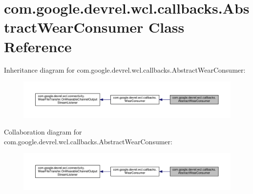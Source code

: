 \hypertarget{classcom_1_1google_1_1devrel_1_1wcl_1_1callbacks_1_1AbstractWearConsumer}{}\section{com.\+google.\+devrel.\+wcl.\+callbacks.\+Abstract\+Wear\+Consumer Class Reference}
\label{classcom_1_1google_1_1devrel_1_1wcl_1_1callbacks_1_1AbstractWearConsumer}


Inheritance diagram for com.\+google.\+devrel.\+wcl.\+callbacks.\+Abstract\+Wear\+Consumer\+:
\nopagebreak
\begin{figure}[H]
\begin{center}
\leavevmode
\includegraphics[width=350pt]{dc/d2d/classcom_1_1google_1_1devrel_1_1wcl_1_1callbacks_1_1AbstractWearConsumer__inherit__graph}
\end{center}
\end{figure}


Collaboration diagram for com.\+google.\+devrel.\+wcl.\+callbacks.\+Abstract\+Wear\+Consumer\+:
\nopagebreak
\begin{figure}[H]
\begin{center}
\leavevmode
\includegraphics[width=350pt]{d1/dfe/classcom_1_1google_1_1devrel_1_1wcl_1_1callbacks_1_1AbstractWearConsumer__coll__graph}
\end{center}
\end{figure}

